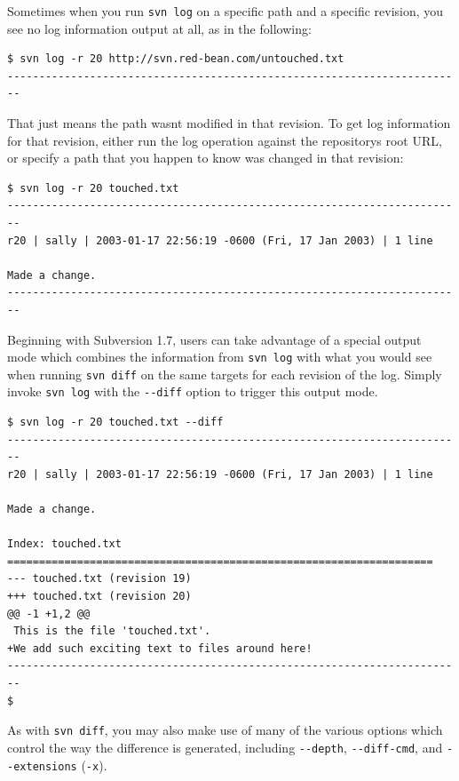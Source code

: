 Sometimes when you run \texttt{svn\ log} on a specific path and a
specific revision, you see no log information output at all, as in the
following:

\begin{verbatim}
$ svn log -r 20 http://svn.red-bean.com/untouched.txt
------------------------------------------------------------------------
\end{verbatim}

That just means the path wasn\textquotesingle t modified in that
revision. To get log information for that revision, either run the log
operation against the repository\textquotesingle s root URL, or specify
a path that you happen to know was changed in that revision:

\begin{verbatim}
$ svn log -r 20 touched.txt 
------------------------------------------------------------------------
r20 | sally | 2003-01-17 22:56:19 -0600 (Fri, 17 Jan 2003) | 1 line

Made a change.
------------------------------------------------------------------------
\end{verbatim}

Beginning with Subversion 1.7, users can take advantage of a special
output mode which combines the information from \texttt{svn\ log} with
what you would see when running \texttt{svn\ diff} on the same targets
for each revision of the log. Simply invoke \texttt{svn\ log} with the
\texttt{-\/-diff} option to trigger this output mode.

\begin{verbatim}
$ svn log -r 20 touched.txt --diff
------------------------------------------------------------------------
r20 | sally | 2003-01-17 22:56:19 -0600 (Fri, 17 Jan 2003) | 1 line

Made a change.

Index: touched.txt
===================================================================
--- touched.txt (revision 19)
+++ touched.txt (revision 20)
@@ -1 +1,2 @@
 This is the file 'touched.txt'.
+We add such exciting text to files around here!
------------------------------------------------------------------------
$
\end{verbatim}

As with \texttt{svn\ diff}, you may also make use of many of the various
options which control the way the difference is generated, including
\texttt{-\/-depth}, \texttt{-\/-diff-cmd}, and \texttt{-\/-extensions}
(\texttt{-x}).

